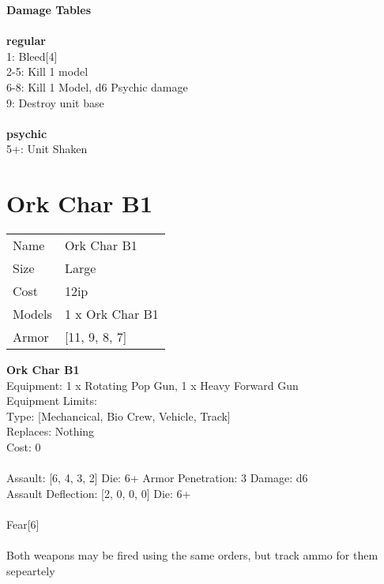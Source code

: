 {\bf Damage Tables} \\
\ \\ {\bf regular } \\
1: Bleed[4] \\
2-5: Kill 1 model \\
6-8: Kill 1 Model, d6 Psychic damage \\
9: Destroy unit base \\
\ \\ {\bf psychic } \\
5+: Unit Shaken \\










\pagebreak\pagebreak

\section{ Ork Char B1 }

\begin{tabular}{ll}
  Name & Ork Char B1 \\
  Size & Large\\
  Cost & 12ip\\
  Models & 1 x Ork Char B1\\
  Armor & [11, 9, 8, 7]\\
\end{tabular}

\noindent 

{\bf Ork Char B1 } \\
Equipment: 1 x Rotating Pop Gun, 1 x Heavy Forward Gun \\
Equipment Limits:  \\
Type: [Mechancical, Bio Crew, Vehicle, Track] \\
Replaces: Nothing \\
Cost: 0\\
\ \\
Assault: [6, 4, 3, 2] Die: 6+ Armor Penetration: 3 Damage: d6 \\
Assault Deflection: [2, 0, 0, 0] Die: 6+\\
\\ 
Fear[6]\\ 
 
\ \\
Both weapons may be fired using the same orders, but track ammo for them sepeartely\\ 

